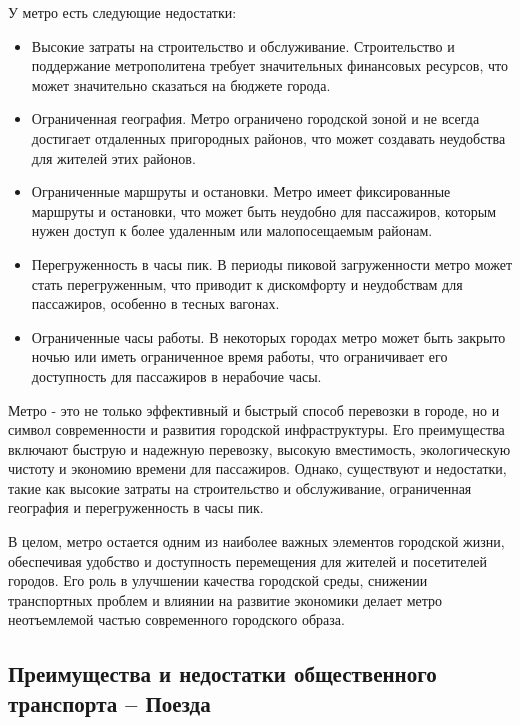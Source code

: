 У метро есть следующие недостатки:
\begin{itemize}
	\item Высокие затраты на строительство и обслуживание. Строительство и поддержание метрополитена требует значительных финансовых ресурсов, что может значительно сказаться на бюджете города.
	\item Ограниченная география. Метро ограничено городской зоной и не всегда достигает отдаленных пригородных районов, что может создавать неудобства для жителей этих районов.
	\item Ограниченные маршруты и остановки. Метро имеет фиксированные маршруты и остановки, что может быть неудобно для пассажиров, которым нужен доступ к более удаленным или малопосещаемым районам.
	\item Перегруженность в часы пик. В периоды пиковой загруженности метро может стать перегруженным, что приводит к дискомфорту и неудобствам для пассажиров, особенно в тесных вагонах.
	\item Ограниченные часы работы. В некоторых городах метро может быть закрыто ночью или иметь ограниченное время работы, что ограничивает его доступность для пассажиров в нерабочие часы.
\end{itemize}

Метро - это не только эффективный и быстрый способ перевозки в городе, но и символ современности и развития городской инфраструктуры. Его преимущества включают быструю и надежную перевозку, высокую вместимость, экологическую чистоту и экономию времени для пассажиров. Однако, существуют и недостатки, такие как высокие затраты на строительство и обслуживание, ограниченная география и перегруженность в часы пик.

В целом, метро остается одним из наиболее важных элементов городской жизни, обеспечивая удобство и доступность перемещения для жителей и посетителей городов. Его роль в улучшении качества городской среды, снижении транспортных проблем и влиянии на развитие экономики делает метро неотъемлемой частью современного городского образа.

\subsection{Преимущества и недостатки общественного транспорта -- Поезда}

